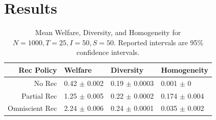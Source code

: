 \documentclass[sigconf]{acmart}
\begin{document}
\section{Results}

\begin{table}[bt]
\centering
\begin{tabular}{rlll}
  \hline
Rec Policy & Welfare & Diversity & Homogeneity \\ 
  \hline
No Rec & 0.42 $\pm$ 0.002 & 0.19 $\pm$ 0.0003 & 0.001 $\pm$ 0 \\ 
Partial Rec & 1.25 $\pm$ 0.005 & 0.22 $\pm$ 0.0002 & 0.174 $\pm$ 0.004 \\ 
Omniscient Rec & 2.24 $\pm$ 0.006 & 0.24 $\pm$ 0.0001 & 0.035 $\pm$ 0.002 \\ 
   \hline
\end{tabular}
\caption{Mean Welfare, Diversity, and Homogeneity for $N = 1000, T = 25, I = 50, S = 50$. Reported intervals are 95\% confidence intervals.}
\label{table:agg_results}
\end{table}
\end{document}
